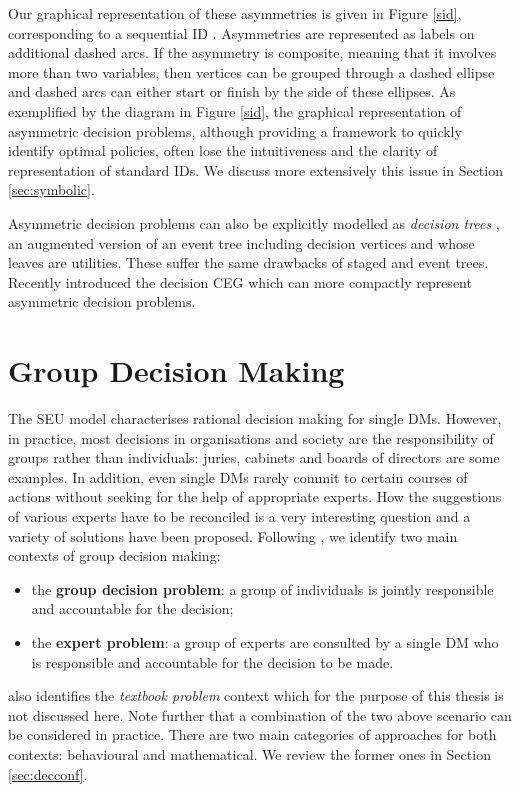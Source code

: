 Our graphical representation of these asymmetries is given in Figure \ref{sid}, corresponding to a sequential ID \citep{Jensen2006}. Asymmetries are represented as labels on additional dashed arcs. If the asymmetry is composite, meaning that it involves more than two variables, then vertices can be grouped through a dashed ellipse and dashed arcs can either start or finish by the side of these ellipses. As exemplified by the diagram in Figure \ref{sid}, the graphical representation of asymmetric decision problems, although providing a framework to quickly identify optimal policies, often lose the intuitiveness and the clarity of representation of standard IDs. We discuss more extensively this issue in Section \ref{sec:symbolic}. 

Asymmetric decision problems can also be explicitly modelled as \textit{decision trees} \citep[see e.g.][]{Clemen1996a,French2009}, an augmented version of an event tree including decision vertices and whose leaves are utilities. These suffer the same drawbacks of staged and event trees. Recently \citet{Cowell2010} introduced the decision CEG which can more compactly represent asymmetric decision problems.
 
\section{Group Decision Making}
\label{sec:group}
The SEU model characterises rational decision making for single DMs. However, in practice, most decisions in organisations and society are the responsibility of groups rather than individuals: juries, cabinets and boards of directors are some examples. In addition, even single DMs rarely commit to certain courses of actions without seeking for the help of appropriate experts. How the suggestions of various experts have to be reconciled is a very interesting question and a variety of solutions have been proposed. Following \citet{French2011}, we identify two main contexts of group decision making:
\begin{itemize}
\item the \textbf{group decision problem}: a group of individuals is jointly responsible and accountable for the decision;
\item the \textbf{expert problem}: a group of experts are consulted by a single DM who is responsible and accountable for the decision to be made.
\end{itemize}
\citet{French2011} also identifies the \textit{textbook problem} context which for the purpose of this thesis is not discussed here. Note further that a combination of the two above scenario can be considered in practice. There are two main categories of approaches for both contexts: behavioural and mathematical. We review the former ones in Section \ref{sec:decconf}.

